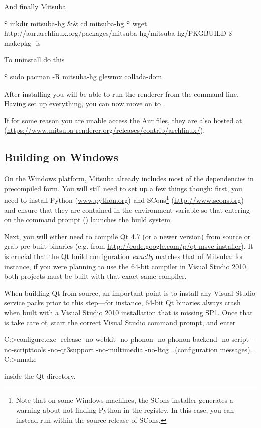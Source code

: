 And finally Mitsuba
\begin{shell}
$\text{\$}$ mkdir mitsuba-hg && cd mitsuba-hg
$\text{\$}$ wget http://aur.archlinux.org/packages/mitsuba-hg/mitsuba-hg/PKGBUILD
$\text{\$}$ makepkg -is
\end{shell}

To uninstall do this
\begin{shell}
$\text{\$}$ sudo pacman -R mitsuba-hg glewmx collada-dom
\end{shell}
After installing you will be able to run the renderer from the command line.
Having set up everything, you can now move on to .

If for some reason you are unable access the Aur files, they are also hosted at 
(\url{https://www.mitsuba-renderer.org/releases/contrib/archlinux/}).

\subsection{Building on Windows}
On the Windows platform, Mitsuba already includes most of the dependencies in precompiled form.
You will still need to set up a few things though: first, you need to install Python 
(\url{www.python.org}) and SCons\footnote{Note that on some Windows machines, the SCons 
installer generates a warning about not finding Python in the registry. In this case, you can instead run  within the source release of SCons.} (\url{http://www.scons.org}) and ensure that they are contained in the  environment variable so that entering  on the command prompt () launches the build system.

Next, you will either need to compile Qt 4.7 (or a newer version) from 
source or grab pre-built binaries (e.g. from 
\url{http://code.google.com/p/qt-msvc-installer}). 
It is crucial that the Qt build configuration \emph{exactly} matches that of Mitsuba: 
for instance, if you were planning to use the 64-bit compiler in Visual 
Studio 2010, both projects must be built with that exact same compiler.

When building Qt from source, an important point is to install any 
Visual Studio service packs prior to this step---for instance, 64-bit
Qt binaries always crash when built with a Visual Studio 2010 installation
that is missing SP1. Once that is take care of, start the correct Visual Studio command 
prompt, and enter
\begin{shell}
C:\Qt>configure.exe -release -no-webkit -no-phonon -no-phonon-backend -no-script
      -no-scripttools -no-qt3support -no-multimedia -no-ltcg
..(configuration messages)..
C:\Qt>nmake
\end{shell}
inside the Qt directory.


